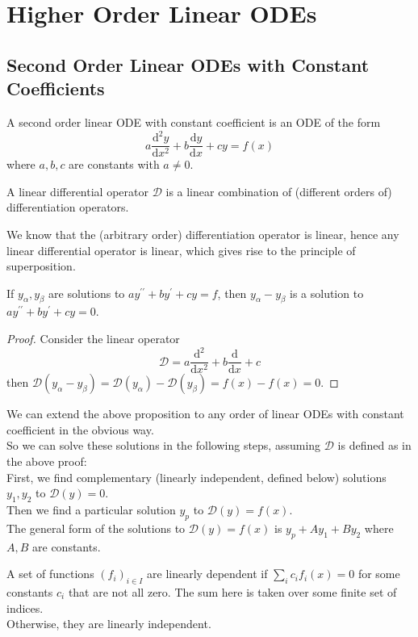 \section{Higher Order Linear ODEs}
\subsection{Second Order Linear ODEs with Constant Coefficients}
\begin{definition}
    A second order linear ODE with constant coefficient is an ODE of the form
    $$a\frac{\mathrm d^2y}{\mathrm dx^2}+b\frac{\mathrm dy}{\mathrm dx}+cy=f(x)$$
    where $a,b,c$ are constants with $a\neq 0$.
\end{definition}
\begin{definition}
    A linear differential operator $\mathscr{D}$ is a linear combination of (different orders of) differentiation operators.
\end{definition}
We know that the (arbitrary order) differentiation operator is linear, hence any linear differential operator is linear, which gives rise to the principle of superposition.
\begin{proposition}
    If $y_\alpha, y_\beta$ are solutions to $ay^{\prime\prime}+by^\prime+cy=f$, then $y_{\alpha}-y_\beta$ is a solution to $ay^{\prime\prime}+by^\prime+cy=0$.
\end{proposition}
\begin{proof}
    Consider the linear operator
    $$\mathscr{D}=a\frac{\mathrm d^2}{\mathrm dx^2}+b\frac{\mathrm d}{\mathrm dx}+c$$
    then $\mathscr{D}(y_\alpha-y_\beta)=\mathscr{D}(y_\alpha)-\mathscr{D}(y_\beta)=f(x)-f(x)=0$.
\end{proof}
We can extend the above proposition to any order of linear ODEs with constant coefficient in the obvious way.\\
So we can solve these solutions in the following steps, assuming $\mathscr{D}$ is defined as in the above proof:\\
First, we find complementary (linearly independent, defined below) solutions $y_1,y_2$ to $\mathscr{D}(y)=0$.\\
Then we find a particular solution $y_p$ to $\mathscr{D}(y)=f(x)$.\\
The general form of the solutions to $\mathscr{D}(y)=f(x)$ is $y_p+Ay_1+By_2$ where $A,B$ are constants.
\begin{definition}
    A set of functions $(f_i)_{i\in I}$ are linearly dependent if $\sum_ic_if_i(x)=0$ for some constants $c_i$ that are not all zero.
    The sum here is taken over some finite set of indices.\\
    Otherwise, they are linearly independent.
\end{definition}
